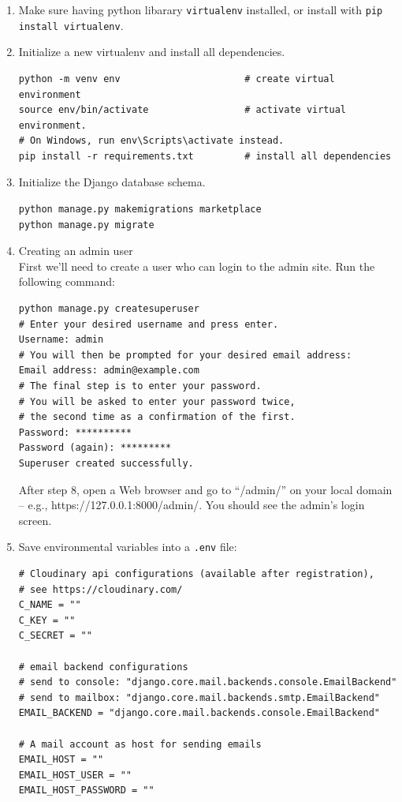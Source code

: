 \begin{enumerate}
\item Make sure having python libarary \texttt{virtualenv} installed, or install with \texttt{pip install virtualenv}.
\item Initialize a new virtualenv and install all dependencies.
\begin{verbatim}
python -m venv env                      # create virtual environment
source env/bin/activate                 # activate virtual environment. 
# On Windows, run env\Scripts\activate instead.
pip install -r requirements.txt         # install all dependencies
\end{verbatim}
\item Initialize the Django database schema.
\begin{verbatim}
python manage.py makemigrations marketplace
python manage.py migrate
\end{verbatim}
\item Creating an admin user \\
First we’ll need to create a user who can login to the admin site. Run the following command:
\begin{verbatim}
python manage.py createsuperuser
# Enter your desired username and press enter.
Username: admin
# You will then be prompted for your desired email address:
Email address: admin@example.com
# The final step is to enter your password. 
# You will be asked to enter your password twice, 
# the second time as a confirmation of the first.
Password: **********
Password (again): *********
Superuser created successfully.
\end{verbatim}
After step 8, open a Web browser and go to “/admin/” on your local domain – e.g., https://127.0.0.1:8000/admin/. You should see the admin’s login screen.
\item Save environmental variables into a \texttt{.env} file:
\begin{verbatim}
# Cloudinary api configurations (available after registration),
# see https://cloudinary.com/
C_NAME = ""
C_KEY = ""
C_SECRET = ""

# email backend configurations
# send to console: "django.core.mail.backends.console.EmailBackend"
# send to mailbox: "django.core.mail.backends.smtp.EmailBackend"
EMAIL_BACKEND = "django.core.mail.backends.console.EmailBackend"

# A mail account as host for sending emails
EMAIL_HOST = ""
EMAIL_HOST_USER = ""
EMAIL_HOST_PASSWORD = ""


\end{verbatim}
\end{enumerate}
